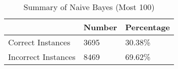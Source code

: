 \begin{table}[h]
        \begin{center}
          \begin{tabular}{|l|l|l|}
          \hline
           & Number & Percentage\\
          \hline\hline
          Correct Instances & 3695 & 30.38\%\\
          \hline
          Incorrect Instances & 8469 & 69.62\% \\
          \hline
          \end{tabular}
          \caption{Summary of Naive Bayes (Most 100)}\label{table1}
        \end{center}
      \end{table}